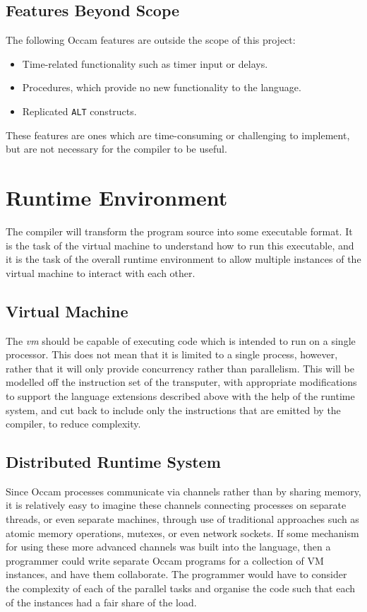 \subsection{Features Beyond Scope} \label{beyond-scope}

The following Occam features are outside the scope of this project:
\begin{itemize}
  \item Time-related functionality such as timer input or delays.
  \item Procedures, which provide no new functionality to the language.
  \item Replicated \texttt{ALT} constructs.
\end{itemize}
These features are ones which are time-consuming or challenging to implement,
but are not necessary for the compiler to be useful.

\section{Runtime Environment}

The compiler will transform the program source into some executable format. It
is the task of the virtual machine to understand how to run this executable, and
it is the task of the overall runtime environment to allow multiple instances of
the virtual machine to interact with each other.

\subsection{Virtual Machine} \label{vm}

The \textit{\gls{vm}} should be capable of executing code which is intended to
run on a single processor. This does not mean that it is limited to a single
process, however, rather that it will only provide concurrency rather than
parallelism. This will be modelled off the instruction set of the
\gls{transputer}, with appropriate modifications to support the language
extensions described above with the help of the runtime system, and cut back to
include only the instructions that are emitted by the compiler, to reduce
complexity.

\subsection{Distributed Runtime System} \label{dist-system}

Since Occam processes communicate via channels rather than by sharing memory, it
is relatively easy to imagine these channels connecting processes on separate
threads, or even separate machines, through use of traditional approaches such
as atomic memory operations, mutexes, or even network sockets. If some mechanism
for using these more advanced channels was built into the language, then a
programmer could write separate Occam programs for a collection of VM instances,
and have them collaborate. The programmer would have to consider the complexity
of each of the parallel tasks and organise the code such that each of the
instances had a fair share of the load.

